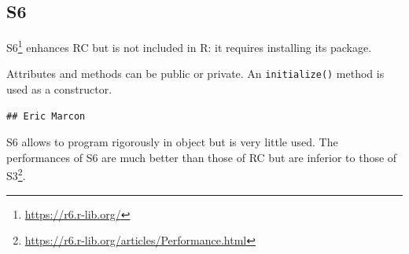 \documentclass[
  12pt,
  american,
  a4paper,
  extrafontsizes,onecolumn,openright
  ]{memoir}
\newenvironment{Shaded}{\begin{snugshade}}{\end{snugshade}}
\newcommand{\AttributeTok}[1]{\textcolor[rgb]{0.77,0.63,0.00}{#1}}
\newcommand{\ConstantTok}[1]{\textcolor[rgb]{0.00,0.00,0.00}{#1}}
\newcommand{\ControlFlowTok}[1]{\textcolor[rgb]{0.13,0.29,0.53}{\textbf{#1}}}
\newcommand{\FunctionTok}[1]{\textcolor[rgb]{0.00,0.00,0.00}{#1}}
\newcommand{\NormalTok}[1]{#1}
\newcommand{\OtherTok}[1]{\textcolor[rgb]{0.56,0.35,0.01}{#1}}
\newcommand{\SpecialCharTok}[1]{\textcolor[rgb]{0.00,0.00,0.00}{#1}}
\newcommand{\StringTok}[1]{\textcolor[rgb]{0.31,0.60,0.02}{#1}}
\newlength{\rf}
\begin{document}
\hypertarget{s6}{%
\subsection{S6}\label{s6}}

S6\footnote{\url{https://r6.r-lib.org/}} enhances RC but is not included in R: it requires installing its package.

Attributes and methods can be public or private.
An \texttt{initialize()} method is used as a constructor.

\scriptsize

\begin{Shaded}
\end{Shaded}

\begin{verbatim}
## Eric Marcon
\end{verbatim}

\normalsize

S6 allows to program rigorously in object but is very little used.
The performances of S6 are much better than those of RC but are inferior to those of S3\footnote{\url{https://r6.r-lib.org/articles/Performance.html}}.
\end{document}
